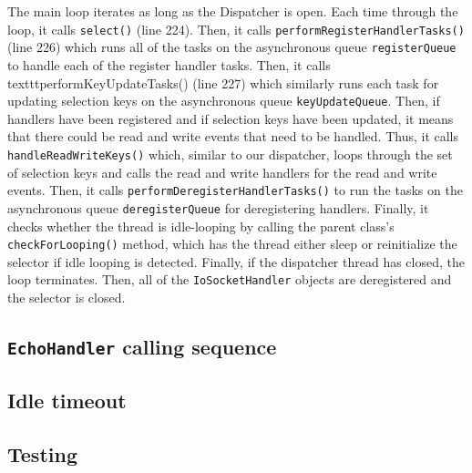 \documentclass[letterpaper,12pt]{article}
\begin{document}
The main loop iterates as long as the Dispatcher is open. Each time through the loop, it calls \texttt{select()} (line 224). Then, it calls \texttt{performRegisterHandlerTasks()} (line 226) which runs all of the tasks on the asynchronous queue \texttt{registerQueue} to handle each of the register handler tasks. Then, it calls texttt{performKeyUpdateTasks()} (line 227) which similarly runs each task for updating selection keys on the asynchronous queue \texttt{keyUpdateQueue}. Then, if handlers have been registered and if selection keys have been updated, it means that there could be read and write events that need to be handled. Thus, it calls \texttt{handleReadWriteKeys()} which, similar to our dispatcher, loops through the set of selection keys and calls the read and write handlers for the read and write events. Then, it calls \texttt{performDeregisterHandlerTasks()} to run the tasks on the asynchronous queue \texttt{deregisterQueue} for deregistering handlers. Finally, it checks whether the thread is idle-looping by calling the parent class's \texttt{checkForLooping()} method, which has the thread either sleep or reinitialize the selector if idle looping is detected. Finally, if the dispatcher thread has closed, the loop terminates. Then, all of the \texttt{IoSocketHandler} objects are deregistered and the selector is closed.

\subsection{\texttt{EchoHandler} calling sequence}

\subsection{Idle timeout}

\subsection{Testing}
\end{document}
